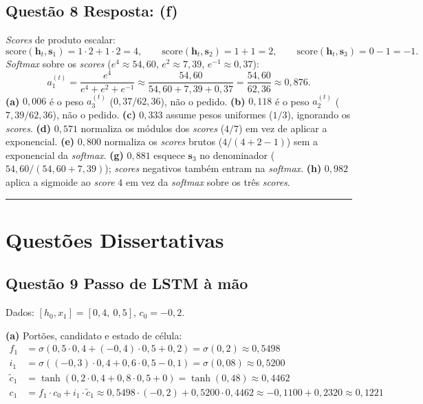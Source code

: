 \documentclass[11pt,a4paper]{article}
\begin{document}
\subsection*{Questão 8 \textemdash{} Resposta: (f)}
\textit{Scores} de produto escalar:
\[
\mathrm{score}(\mathbf{h}_t, \mathbf{s}_1) = 1 \cdot 2 + 1 \cdot 2 = 4, \qquad
\mathrm{score}(\mathbf{h}_t, \mathbf{s}_2) = 1 + 1 = 2, \qquad
\mathrm{score}(\mathbf{h}_t, \mathbf{s}_3) = 0 - 1 = -1.
\]
\textit{Softmax} sobre os \textit{scores} ($e^{4} \approx 54{,}60$, $e^{2} \approx 7{,}39$, $e^{-1} \approx 0{,}37$):
\[
a_1^{(t)} = \frac{e^{4}}{e^{4} + e^{2} + e^{-1}} \approx \frac{54{,}60}{54{,}60 + 7{,}39 + 0{,}37} = \frac{54{,}60}{62{,}36} \approx 0{,}876.
\]
\textbf{(a)} $0{,}006$ é o peso $a_3^{(t)}$ ($0{,}37/62{,}36$), não o pedido.
\textbf{(b)} $0{,}118$ é o peso $a_2^{(t)}$ ($7{,}39/62{,}36$), não o pedido.
\textbf{(c)} $0{,}333$ assume pesos uniformes ($1/3$), ignorando os \textit{scores}.
\textbf{(d)} $0{,}571$ normaliza os módulos dos \textit{scores} ($4/7$) em vez de aplicar a exponencial.
\textbf{(e)} $0{,}800$ normaliza os \textit{scores} brutos ($4/(4+2-1)$) sem a exponencial da \textit{softmax}.
\textbf{(g)} $0{,}881$ esquece $\mathbf{s}_3$ no denominador ($54{,}60/(54{,}60+7{,}39)$); \textit{scores} negativos também entram na \textit{softmax}.
\textbf{(h)} $0{,}982$ aplica a sigmoide ao \textit{score} $4$ em vez da \textit{softmax} sobre os três \textit{scores}.

\color{black}
\rule{\linewidth}{0.4pt}

\section*{Questões Dissertativas}

\color{blue}

\subsection*{Questão 9 \textemdash{} Passo de LSTM à mão}

Dados: $[h_0, x_1] = [0{,}4,\ 0{,}5]$, $c_0 = -0{,}2$.

\textbf{(a)} Portões, candidato e estado de célula:
\begin{align*}
    f_1 &= \sigma(0{,}5 \cdot 0{,}4 + (-0{,}4) \cdot 0{,}5 + 0{,}2) = \sigma(0{,}2) \approx 0{,}5498 \\
    i_1 &= \sigma((-0{,}3) \cdot 0{,}4 + 0{,}6 \cdot 0{,}5 - 0{,}1) = \sigma(0{,}08) \approx 0{,}5200 \\
    \tilde{c}_1 &= \tanh(0{,}2 \cdot 0{,}4 + 0{,}8 \cdot 0{,}5 + 0) = \tanh(0{,}48) \approx 0{,}4462 \\
    c_1 &= f_1 \cdot c_0 + i_1 \cdot \tilde{c}_1 \approx 0{,}5498 \cdot (-0{,}2) + 0{,}5200 \cdot 0{,}4462 \approx -0{,}1100 + 0{,}2320 \approx 0{,}1221
\end{align*}
\end{document}
